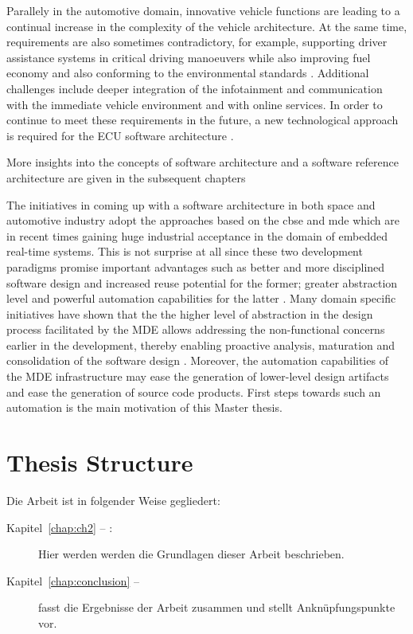 Parallely in the automotive domain, innovative vehicle functions are leading to a continual increase in the complexity of the vehicle architecture. At the same time, requirements are also sometimes contradictory, for example, supporting driver assistance systems in critical driving manoeuvers while also improving fuel economy and also conforming to the environmental standards \cite{AUTOSARurl}. Additional challenges include deeper integration of the infotainment and communication with the immediate vehicle environment and with online services. In order to continue to meet these requirements in the future, a new technological approach is required for the ECU software architecture \cite{AUTOSARurl}.  

More insights into the concepts of software architecture and a software reference architecture are given in the subsequent chapters     

The initiatives in coming up with a software architecture in both space and automotive industry adopt the approaches based on the \ac{cbse} and \ac{mde} which are in recent times gaining huge industrial acceptance in the domain of embedded real-time systems. This is not surprise at all since these two development paradigms promise important advantages such as better and more disciplined software design and increased reuse potential for the former; greater abstraction level and powerful automation capabilities for the latter \cite{CBSE}\cite{PhdThesis}. Many domain specific initiatives have shown that the the higher level of abstraction in the design process facilitated by the MDE allows addressing the non-functional concerns earlier in the development, thereby enabling proactive analysis, maturation and consolidation of the software design \cite{CompBasedDev}. Moreover, the automation capabilities of the MDE infrastructure may ease the generation of lower-level design artifacts and ease the generation of source code products.
First steps towards such an automation is the main motivation of this Master thesis.  

\section*{Thesis Structure}
Die Arbeit ist in folgender Weise gegliedert:
\begin{description}
\item[Kapitel~\ref{chap:ch2} -- :] Hier werden werden die Grundlagen dieser Arbeit beschrieben.
\item[Kapitel~\ref{chap:conclusion} -- ] fasst die Ergebnisse der Arbeit zusammen und stellt Anknüpfungspunkte vor.
\end{description}
